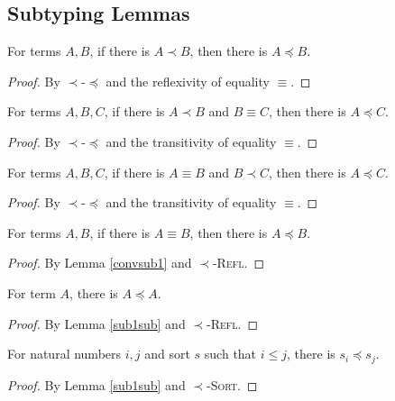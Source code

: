 \documentclass[sigplan,screen,review,anonymous]{acmart}
\newcommand{\rname}[1]{\textsc{\footnotesize #1}}
\begin{document}
\subsection{Subtyping Lemmas}

\begin{lemma}\label{sub1sub}
  For terms $A, B$, if there is $A \prec B$, then there is $A \preceq B$.
\end{lemma}
\begin{proof}
  By \rname{$\prec$-$\preceq$} and the reflexivity of equality $\equiv$.
\end{proof}

\begin{lemma}\label{sub1conv}
  For terms $A, B, C$, if there is $A \prec B$ and $B \equiv C$, then there is $A \preceq C$.
\end{lemma}
\begin{proof}
  By \rname{$\prec$-$\preceq$} and the transitivity of equality $\equiv$.
\end{proof}

\begin{lemma}\label{convsub1}
  For terms $A, B, C$, if there is $A \equiv B$ and $B \prec C$, then there is $A \preceq C$.
\end{lemma}
\begin{proof}
  By \rname{$\prec$-$\preceq$} and the transitivity of equality $\equiv$.
\end{proof}

\begin{lemma}\label{convsub}
  For terms $A, B$, if there is $A \equiv B$, then there is $A \preceq B$.
\end{lemma}
\begin{proof}
  By Lemma \ref{convsub1} and \rname{$\prec$-Refl}.
\end{proof}

\begin{lemma}\label{subrefl}
  For term $A$, there is $A \preceq A$.
\end{lemma}
\begin{proof}
  By Lemma \ref{sub1sub} and \rname{$\prec$-Refl}.
\end{proof}

\begin{lemma}\label{subprop}
  For natural numbers $i, j$ and sort $s$ such that $i \leq j$, there is $s_i \preceq s_j$.
\end{lemma}
\begin{proof}
  By Lemma \ref{sub1sub} and \rname{$\prec$-Sort}.
\end{proof}
\end{document}
